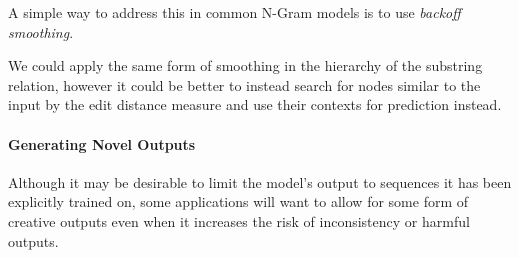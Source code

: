A simple way to address this in common N-Gram models is to use \textit{backoff smoothing}. 

We could apply the same form of smoothing in the hierarchy of the substring relation, however it could be better to instead search for nodes similar to the input by the edit distance measure and use their contexts for prediction instead.

\paragraph{Generating Novel Outputs}
Although it may be desirable to limit the model's output to sequences it has been explicitly trained on, some applications will want to allow for some form of creative outputs even when it increases the risk of inconsistency or harmful outputs.


